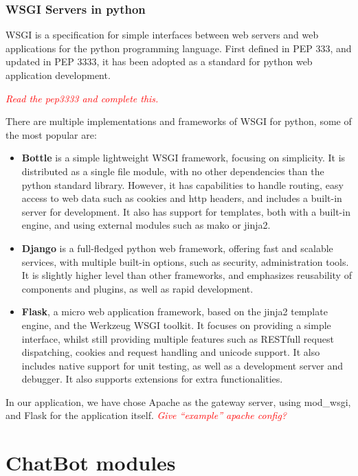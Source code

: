 \subsubsection{WSGI Servers in python}

\ac{WSGI} is a specification for simple interfaces between web servers and web applications for the python programming language. First defined in PEP 333\cite{pep0333}, and updated in PEP 3333\cite{pep3333}, it has been adopted as a standard for python web application development.

\emph{\textcolor{red}{Read the pep3333 and complete this.}}

There are multiple implementations and frameworks of WSGI for python, some of the most popular are:

\begin{itemize}
 \item \textbf{Bottle} is a simple lightweight WSGI framework, focusing on simplicity. It is distributed as a single file module, with no other dependencies than the python standard library. However, it has capabilities to handle routing, easy access to web data such as cookies and http headers, and includes a built-in server for development. It also has support for templates, both with a built-in engine, and using external modules such as mako or jinja2.
 \item \textbf{Django} is a full-fledged python web framework, offering fast and scalable services, with multiple built-in options, such as security, administration tools. It is slightly higher level than other frameworks, and emphasizes reusability of components and plugins, as well as rapid development. %
 \item \textbf{Flask}, a micro web application framework, based on the jinja2 template engine, and the Werkzeug WSGI toolkit. It focuses on providing a simple interface, whilst still providing multiple features such as RESTfull request dispatching, cookies and request handling and unicode support. It also includes native support for unit testing, as well as a development server and debugger. It also supports extensions for extra functionalities.
\end{itemize}

In our application, we have chose Apache as the gateway server, using mod\_wsgi, and Flask for the application itself. \emph{\textcolor{red}{Give ``example'' apache config?}}


\section{ChatBot modules}

